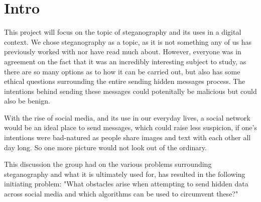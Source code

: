 \section*{Intro}
This project will focus on the topic of steganography and its uses in a digital context.
We chose steganography as a topic, as it is not something any of us has previously worked with nor have read much about. However, everyone was in agreement on the fact that it was an incredibly interesting subject to study, as there are so many options as to how it can be carried out, but also has some ethical questions surrounding the entire sending hidden messages process. The intentions behind sending these messages could potenitally be malicious but could also be benign.

With the rise of social media, and its use in our everyday lives, a social network would be an ideal place to send messages, which could raise less suspicion, if one's intentions were bad-natured as people share images and text with each other all day long. So one more picture would not look out of the ordinary. 

This discussion the group had on the various problems surrounding steganography and what it is ultimately used for, has resulted in the following initiating problem: 
"What obstacles arise when attempting to send hidden data across social media and which algorithms can be used to circumvent these?"